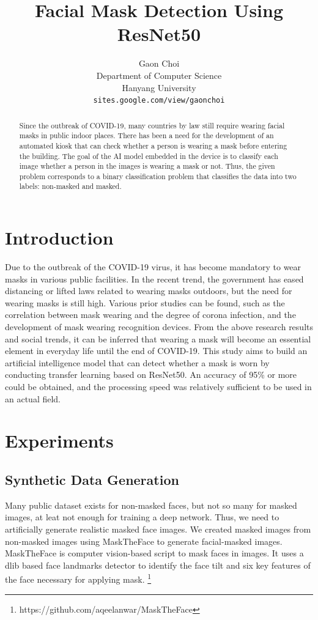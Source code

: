 \documentclass{article}
\title{Facial Mask Detection Using ResNet50}
\author{Gaon Choi\\
Department of Computer Science\\
Hanyang University\\
\texttt{sites.google.com/view/gaonchoi}
}
\begin{document}
\maketitle

\begin{abstract}
Since the outbreak of COVID-19, many countries by law still require wearing facial masks in public indoor places.
There has been a need for the development of an automated kiosk that can check whether a person is wearing a mask before entering the building.
The goal of the AI model embedded in the device is to classify each image whether a person in the images is wearing a mask or not.
Thus, the given problem corresponds to a binary classification problem that classifies the data into two labels: non-masked and masked.

\end{abstract}

\section{Introduction}
Due to the outbreak of the COVID-19 virus, it has become mandatory to wear masks in various public facilities.
In the recent trend, the government has eased distancing or lifted laws related to wearing masks outdoors, but the need for wearing masks is still high.
Various prior studies can be found, such as the correlation between mask wearing and the degree of corona infection, and the development of mask wearing recognition devices.
From the above research results and social trends, it can be inferred that wearing a mask will become an essential element in everyday life until the end of COVID-19.
This study aims to build an artificial intelligence model that can detect whether a mask is worn by conducting transfer learning based on ResNet50.
An accuracy of 95\% or more could be obtained, and the processing speed was relatively sufficient to be used in an actual field.

\section{Experiments}
\subsection{Synthetic Data Generation}
Many public dataset exists for non-masked faces, but not so many for masked images, at leat not enough for training a deep network.
Thus, we need to artificially generate realistic masked face images.
We created masked images from non-masked images using MaskTheFace to generate facial-masked images.
MaskTheFace is computer vision-based script to mask faces in images.
It uses a dlib based face landmarks detector to identify the face tilt and six key features of the face necessary for applying mask.
\footnote[1] {https://github.com/aqeelanwar/MaskTheFace}
\end{document}
